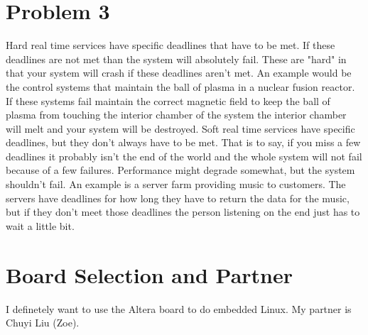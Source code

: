 \documentclass{article}
\begin{document}
\section*{Problem 3}
Hard real time services have specific deadlines that have to be met. If these deadlines are not met than the system will absolutely fail. These are "hard" in that your system will crash if these deadlines aren't met. An example would be the control systems that maintain the ball of plasma in a nuclear fusion reactor. If these systems fail maintain the correct magnetic field to keep the ball of plasma from touching the interior chamber of the system the interior chamber will melt and your system will be destroyed.
Soft real time services have specific deadlines, but they don't always have to be met. That is to say, if you miss a few deadlines it probably isn't the end of the world and the whole system will not fail because of a few failures. Performance might degrade somewhat, but the system shouldn't fail. An example is a server farm providing music to customers. The servers have deadlines for how long they have to return the data for the music, but if they don't meet those deadlines the person listening on the end just has to wait a little bit. 

\section*{Board Selection and Partner}
I definetely want to use the Altera board to do embedded Linux. My partner is Chuyi Liu (Zoe).
\end{document}
